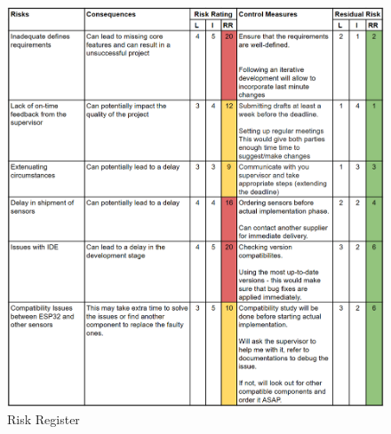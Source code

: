 \begin{figure}
    \centering
    \includegraphics[width=1\linewidth]{images/rr.png}
    \caption{Risk Register}
    \label{fig:rr}
\end{figure}

\newpage
